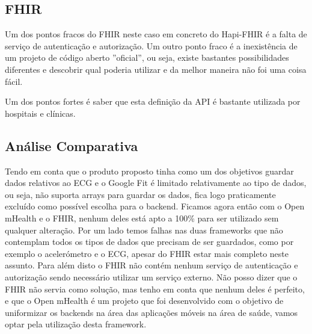 \subsection{FHIR}

Um dos pontos fracos do FHIR neste caso em concreto do Hapi-FHIR é a falta de serviço de autenticação e autorização. Um outro ponto fraco é a inexistência de um projeto de código aberto ''oficial'', ou seja, existe bastantes possibilidades diferentes e descobrir qual poderia utilizar e da melhor maneira não foi uma coisa fácil.
\par
Um dos pontos fortes é saber que esta definição da \gls{API} é bastante utilizada por hospitais e clínicas.
\subsection{Análise Comparativa}
Tendo em conta que o produto proposto tinha como um dos objetivos guardar dados relativos ao \gls{ECG} e o Google Fit é limitado relativamente ao tipo de dados, ou seja, não suporta arrays para guardar os dados, fica logo praticamente excluído como possível escolha para o backend.
Ficamos agora então com o Open mHealth e o FHIR, nenhum deles está apto a 100\% para ser utilizado sem qualquer alteração. Por um lado temos falhas nas duas frameworks que não contemplam todos os tipos de dados que precisam de ser guardados, como por exemplo o acelerómetro e o \gls{ECG}, apesar do \gls{FHIR} estar mais completo neste assunto.
Para além disto o \gls{FHIR} não contém nenhum serviço de autenticação e autorização sendo necessário utilizar um serviço externo.
Não posso dizer que o \gls{FHIR} não servia como solução, mas tenho em conta que nenhum deles é perfeito, e que o Open mHealth é um projeto que foi desenvolvido com o objetivo de uniformizar os backends na área das aplicações móveis na área de saúde, vamos optar pela utilização desta framework.

\cleardoublepage